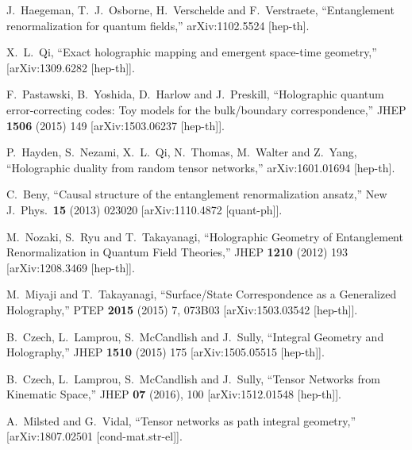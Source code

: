 \documentclass[a4paper,12pt]{article}
\begin{document}
\begin{thebibliography}{}
  J.~Haegeman, T.~J.~Osborne, H.~Verschelde and F.~Verstraete,
  ``Entanglement renormalization for quantum fields,''  
 arXiv:1102.5524 [hep-th].

X.~L.~Qi,
``Exact holographic mapping and emergent space-time geometry,''
[arXiv:1309.6282 [hep-th]].

 F.~Pastawski, B.~Yoshida, D.~Harlow and J.~Preskill,
  ``Holographic quantum error-correcting codes: Toy models for the bulk/boundary correspondence,''
  JHEP {\bf 1506} (2015) 149
  [arXiv:1503.06237 [hep-th]].

  P.~Hayden, S.~Nezami, X.~L.~Qi, N.~Thomas, M.~Walter and Z.~Yang,
  ``Holographic duality from random tensor networks,''
  arXiv:1601.01694 [hep-th].
%

  C.~Beny,
  ``Causal structure of the entanglement renormalization ansatz,''
  New J.\ Phys.\  {\bf 15} (2013) 023020
  [arXiv:1110.4872 [quant-ph]].

  M.~Nozaki, S.~Ryu and T.~Takayanagi,
  ``Holographic Geometry of Entanglement Renormalization in Quantum Field Theories,''  
  JHEP {\bf 1210} (2012) 193  
  [arXiv:1208.3469 [hep-th]].  

  M.~Miyaji and T.~Takayanagi,
  ``Surface/State Correspondence as a Generalized Holography,''  
 PTEP {\bf 2015} (2015) 7,  073B03  
 [arXiv:1503.03542 [hep-th]].  

 B.~Czech, L.~Lamprou, S.~McCandlish and J.~Sully,
  ``Integral Geometry and Holography,''
  JHEP {\bf 1510} (2015) 175
  [arXiv:1505.05515 [hep-th]].

B.~Czech, L.~Lamprou, S.~McCandlish and J.~Sully,
``Tensor Networks from Kinematic Space,''
JHEP \textbf{07} (2016), 100
[arXiv:1512.01548 [hep-th]].

A.~Milsted and G.~Vidal,
``Tensor networks as path integral geometry,''
[arXiv:1807.02501 [cond-mat.str-el]].


\end{thebibliography}
\end{document}
